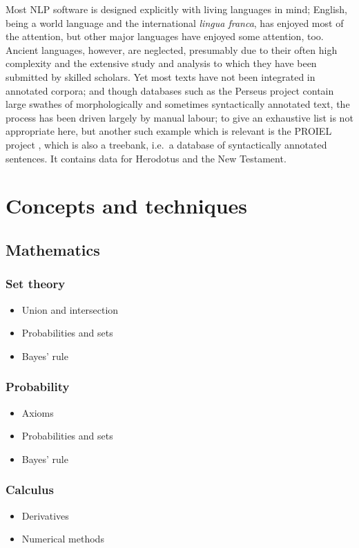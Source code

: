Most NLP software is designed explicitly with living languages in mind;
English, being a world language and the international \textit{lingua franca},
has enjoyed most of the attention, but other major languages have enjoyed some
attention, too. Ancient languages, however, are neglected, presumably due to
their often high complexity and the extensive study and analysis to which they
have been submitted by skilled scholars. Yet most texts have not been
integrated in annotated corpora; and though databases such as the Perseus
project contain large swathes of morphologically and sometimes syntactically
annotated text, the process has been driven largely by manual labour; to give
an exhaustive list is not appropriate here, but another such example which is
relevant is the PROIEL project \citep{proiel}, which is also a treebank, i.e.\ a database of
syntactically annotated sentences. It contains data for Herodotus and the New Testament.

\section{Concepts and techniques}

\subsection{Mathematics}
\label{sec:mathematics}

\subsubsection{Set theory}
\label{sec:settheory}
\begin{itemize}
  \item Union and intersection
  \item Probabilities and sets
  \item Bayes' rule
\end{itemize}

\subsubsection{Probability}
\label{sec:probability}
\begin{itemize}
  \item Axioms
  \item Probabilities and sets
  \item Bayes' rule
\end{itemize}

\subsubsection{Calculus}
\label{sec:calculus}
\begin{itemize}
  \item Derivatives
  \item Numerical methods
\end{itemize}

